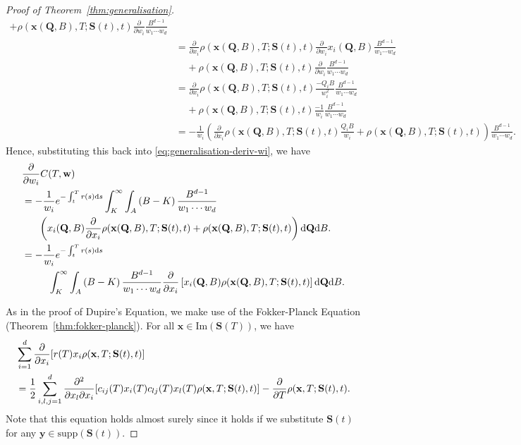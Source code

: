 \documentclass[english]{article}
\numberwithin{equation}{section}
\numberwithin{figure}{section}
\theoremstyle{bolddescit}
\theoremstyle{definition}
\theoremstyle{definition}
\theoremstyle{plain}
\theoremstyle{plain}
\theoremstyle{bolddesc}
\theoremstyle{plain}
\theoremstyle{remark}
\begin{document}
\begin{proof}[Proof of Theorem~\ref{thm:generalisation}]
\begin{align*}
      + \rho(\mathbf{x}(\mathbf{Q},B),T;\mathbf{S}(t),t) \frac{\partial}{\partial w_i} \frac{B^{d-1}}{w_1 \cdots w_d}\\
    &= \frac{\partial}{\partial x_i} \rho(\mathbf{x}(\mathbf{Q},B),T;\mathbf{S}(t),t) \frac{\partial}{\partial w_i} x_i(\mathbf{Q},B) \frac{B^{d-1}}{w_1 \cdots w_d}\\
      &\ \ \ \ \ + \rho(\mathbf{x}(\mathbf{Q},B),T;\mathbf{S}(t),t) \frac{\partial}{\partial w_i} \frac{B^{d-1}}{w_1 \cdots w_d} \\
    &= \frac{\partial}{\partial x_i} \rho(\mathbf{x}(\mathbf{Q},B),T;\mathbf{S}(t),t) \frac{-Q_i B}{w_i^2} \frac{B^{d-1}}{w_1 \cdots w_d}\\
      &\ \ \ \ \ + \rho(\mathbf{x}(\mathbf{Q},B),T;\mathbf{S}(t),t) \frac{-1}{w_i} \frac{B^{d-1}}{w_1 \cdots w_d}\\
    &= -\frac{1}{w_i} \left(\frac{\partial}{\partial x_i} \rho(\mathbf{x}(\mathbf{Q},B),T;\mathbf{S}(t),t) \frac{Q_i B}{w_i}
      + \rho(\mathbf{x}(\mathbf{Q},B),T;\mathbf{S}(t),t)\right) \frac{B^{d-1}}{w_1 \cdots w_d}.
  \end{align*}
  Hence, substituting this back into \eqref{eq:generalisation-deriv-wi}, we have
  \begin{align}
    &\frac{\partial}{\partial w_i} C(T,\mathbf{w})\notag\\
    &= - \frac{1}{w_i}e^{-\int_t^T r(s) \mathrm{d}s}\int_K^\infty \int_A \left(B - K\right) \frac{B^{d-1}}{w_1 \cdots w_d}\notag\\
      &\ \ \ \ \ \left(x_i(\mathbf{Q},B)\frac{\partial}{\partial x_i} \rho(\mathbf{x}(\mathbf{Q},B),T;\mathbf{S}(t),t) + \rho(\mathbf{x}(\mathbf{Q},B),T;\mathbf{S}(t),t)\right) \mathrm{d}\mathbf{Q} \mathrm{d}B.\notag\\
    &= - \frac{1}{w_i}e^{-\int_t^T r(s) \mathrm{d}s}\notag\\
    &\ \ \ \ \ \ \ \ \int_K^\infty \int_A \left(B - K\right) \frac{B^{d-1}}{w_1 \cdots w_d}
        \frac{\partial}{\partial x_i}\left[x_i(\mathbf{Q},B) \rho(\mathbf{x}(\mathbf{Q},B),T;\mathbf{S}(t),t) \right] \mathrm{d}\mathbf{Q} \mathrm{d}B.\label{eq:generalisation-dC-dw}
  \end{align}

  As in the proof of Dupire's Equation, we make use of the Fokker-Planck Equation (Theorem~\ref{thm:fokker-planck}). For all $\mathbf{x} \in \mathrm{Im}(\mathbf{S}(T))$, we have
  \begin{align}
    &\sum_{i=1}^d \frac{\partial}{\partial x_i}[r(T) x_i \rho(\mathbf{x},T;\mathbf{S}(t),t)]\notag\\
      &= \frac{1}{2} \sum_{i,l,j=1}^{d} \frac{\partial^2}{\partial x_l \partial x_i}[c_{ij}(T) x_i(T) c_{lj}(T) x_l(T) \rho(\mathbf{x},T;\mathbf{S}(t),t)]
        -\frac{\partial}{\partial T}\rho(\mathbf{x},T;\mathbf{S}(t),t).\label{eq:generalisation-fokker-planck}
  \end{align}
  Note that this equation holds almost surely since it holds if we substitute $\mathbf{S}(t)$ for any $\mathbf{y} \in \mathrm{supp}(\mathbf{S}(t))$.


\end{proof}
\end{document}
